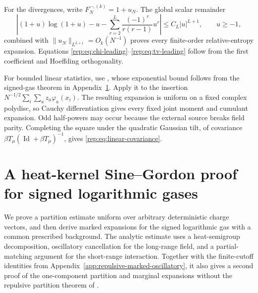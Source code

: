 \documentclass[11pt,reqno]{amsart}
\numberwithin{equation}{section}
\theoremstyle{plain}
\theoremstyle{definition}
\newcommand{\Id}{\operatorname{Id}}
\newcommand{\be}{\beta}
\begin{document}
For the divergences, write $F_N^{-,(k)}=1+u_N$. The global scalar remainder
\begin{equation}\label{rep:eq:entropy-global-remainder}
 \left|(1+u)\log(1+u)-u-
 \sum_{r=2}^{L}\frac{(-1)^r}{r(r-1)}u^r\right|
 \le C_L|u|^{L+1},\qquad u\ge-1,
\end{equation}
combined with $\|u_N\|_{L^{L+1}}=O_k(N^{-1})$ proves every finite-order relative-entropy expansion. Equations \eqref{rep:eq:chi-leading}--\eqref{rep:eq:tv-leading} follow from the first coefficient and Hoeffding orthogonality.

For bounded linear statistics, use , whose exponential bound follows from the signed-gas theorem in Appendix~\ref{app:signed-log-heat-kernel}. Apply it to the insertion $N^{-1/2}\sum_i\sum_a z_a\varphi_a(x_i)$. The resulting expansion is uniform on a fixed complex polydisc, so Cauchy differentiation gives every fixed joint moment and cumulant expansion. Odd half-powers may occur because the external source breaks field parity. Completing the square under the quadratic Gaussian tilt, of covariance $\be T_\mu(\Id+\be T_\mu)^{-1}$, gives \eqref{rep:eq:linear-covariance}.




\section{A heat-kernel Sine--Gordon proof for signed logarithmic gases}
\label{app:signed-log-heat-kernel}

We prove a partition estimate uniform over arbitrary deterministic charge vectors, and then derive marked expansions for the signed logarithmic gas with a common prescribed background. The analytic estimate uses a heat-semigroup decomposition, oscillatory cancellation for the long-range field, and a partial-matching argument for the short-range interaction. Together with the finite-cutoff identities from Appendix~\ref{app:repulsive-marked-oscillatory}, it also gives a second proof of the one-component partition and marginal expansions without the repulsive partition theorem of \cite{DelgadinoGvalaniRosenzweig2026}.
\end{document}
